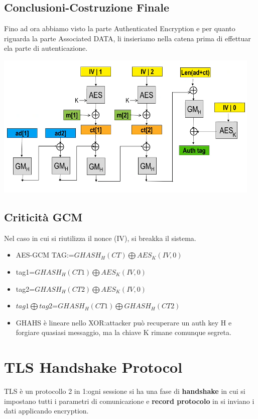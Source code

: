 \documentclass{book}
\theoremstyle{remark}
\begin{document}
\section{Conclusioni-Costruzione Finale}
Fino ad ora abbiamo visto la parte Authenticated Encryption e per quanto riguarda la parte Associated DATA, li insieriamo nella catena prima di
effettuar ela parte di autenticazione\@.
\begin{center}
	\includegraphics*[scale=1]{2021-11-21-22-46-55.png}
\end{center}
\section{Criticità GCM}
Nel caso in cui si riutilizza il nonce (IV), si breakka il sistema\@.
\begin{itemize}
	\item AES-GCM TAG:\@tag=\( GHASH_H (CT)\bigoplus AES_K (IV,0)\)
	\item tag1=\( GHASH_H (CT1)\bigoplus AES_K (IV,0)\)
	\item tag2=\( GHASH_H (CT2)\bigoplus AES_K (IV,0)\)
	\item \(tag1\bigoplus tag2\)=\( GHASH_H (CT1)\bigoplus GHASH_H (CT2)\)
	\item GHAHS è lineare nello XOR:\@un attacker può recuperare un auth key H e forgiare quasiasi messaggio, ma la chiave K rimane comunque segreta\@.
\end{itemize}
\chapter{TLS Handshake Protocol}
TLS è un protocollo 2 in 1:\@in ogni sessione si ha una fase di \textbf{handshake} in cui si impostano tutti i parametri di comunicazione e \textbf{record protocolo} in
si inviano i dati applicando encryption\@.
\end{document}
